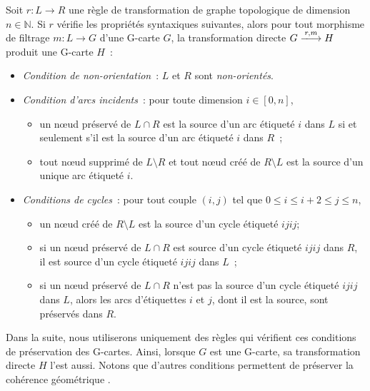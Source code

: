 \begin{theoreme}
	\label{thm:preservation-coherence-topo-gcarte}
	Soit $r : L \longrightarrow R$ une règle de transformation de graphe topologique de dimension $n \in \mathbb{N}$. Si $r$
	vérifie les propriétés syntaxiques suivantes, alors pour tout morphisme de
	filtrage $m : L \to G$ d'une G-carte $G$, la transformation directe
	$G \xlongrightarrow{r,m} H$ produit une G-carte $H$~:


	\begin{itemize}
		\item \emph{Condition de non-orientation}~: $L$ et $R$ sont
		      \emph{non-orientés}.
		\item \emph{Condition d'arcs incidents}~: pour toute dimension
		      $i \in [0,n]$,
		      \begin{itemize}
			      \item un n\oe ud préservé de $L \cap R$ est la source d'un arc
			            étiqueté $i$ dans $L$ si et seulement s'il est la source
			            d'un arc étiqueté $i$ dans $R$~;
			      \item tout n\oe ud supprimé de $L \setminus R$ et tout n\oe ud créé de $R \setminus L$
			            est la source d'un unique arc étiqueté $i$.
		      \end{itemize}
		\item \emph{Conditions de cycles}~: pour tout couple $(i,j)$ tel que
		      $0 \leq i \leq i + 2 \leq j \leq n$,
		      \begin{itemize}
			      \item un n\oe ud créé de $R \setminus L$ est la source d'un cycle étiqueté
			            $ijij$;
			      \item si un n\oe ud préservé de $L \cap R$ est source d'un cycle
			            étiqueté $ijij$ dans $R$, il est source d'un cycle
			            étiqueté $ijij$ dans $L$~;
			      \item si un n\oe ud préservé de $L \cap R$ n'est pas la source d'un
			            cycle étiqueté $ijij$ dans $L$, alors les arcs
			            d'étiquettes $i$ et $j$, dont il est la source, sont
			            préservés dans $R$.
		      \end{itemize}
	\end{itemize}
\end{theoreme}

\begin{remarque}
	Dans la suite, nous utiliserons uniquement des règles qui vérifient ces
	conditions de préservation des G-cartes. %
	Ainsi, lorsque $G$ est une G-carte, sa transformation directe $H$ l'est
	aussi. Notons que d'autres conditions permettent de préserver la cohérence géométrique \cite{bellet2011rule,arnould2022preserving}.
\end{remarque}




